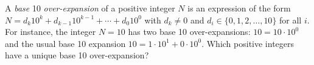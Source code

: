 A \textit{base} 10 \textit{over-expansion} of a positive integer $N$ is an expression of the form $N=d_k10^k+d_{k-1}10^{k-1}+\cdots+d_0 10^0$ with $d_k\ne 0$ and $d_i\in\{0,1,2,\dots,10\}$ for all $i.$ For instance, the integer $N=10$ has two base 10 over-expansions: $10=10\cdot 10^0$ and the usual base 10 expansion $10=1\cdot 10^1+0\cdot 10^0.$ Which positive integers have a unique base 10 over-expansion?